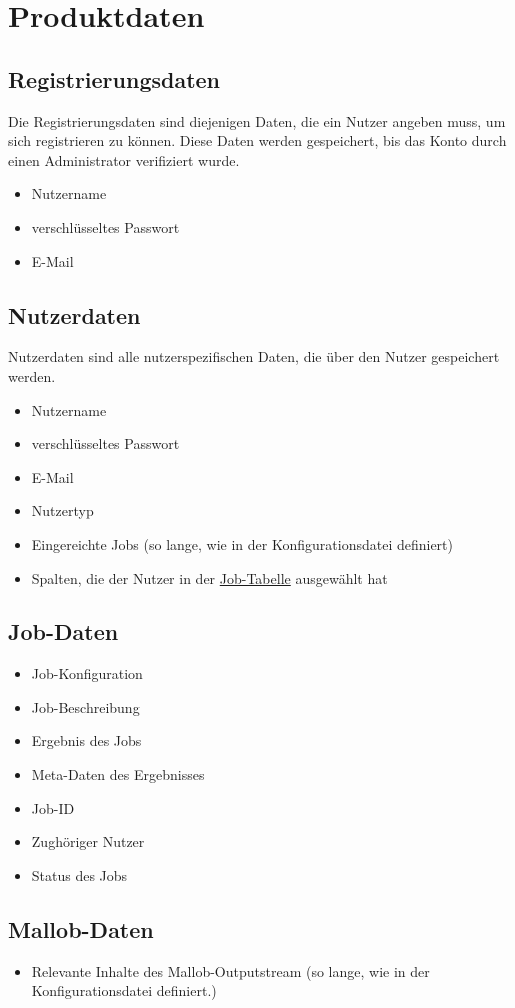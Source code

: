 
\section{Produktdaten}
\label{PD}

\label{PD:Registrierungsdaten}
\subsection{Registrierungsdaten}
Die Registrierungsdaten sind diejenigen Daten, die ein Nutzer angeben muss, um sich registrieren zu können. Diese Daten werden gespeichert, bis das Konto durch einen Administrator verifiziert wurde.
\begin{itemize}[noitemsep]
    \item Nutzername
    \item verschlüsseltes Passwort
    \item E-Mail
\end{itemize}

\label{PD:Nutzerdaten}
\subsection{Nutzerdaten}
Nutzerdaten sind alle nutzerspezifischen Daten, die über den Nutzer gespeichert werden.
\begin{itemize}[noitemsep]
    \item Nutzername
    \item verschlüsseltes Passwort
    \item E-Mail
    \item Nutzertyp
    \item Eingereichte Jobs (so lange, wie in der Konfigurationsdatei definiert)
    \item Spalten, die der Nutzer in der \hyperref[pages:job-table]{Job-Tabelle} ausgewählt hat
\end{itemize}



\subsection{Job-Daten}
\begin{itemize}[noitemsep]
    \item Job-Konfiguration
    \item Job-Beschreibung
    \item Ergebnis des Jobs
    \item Meta-Daten des Ergebnisses
    \item Job-ID
    \item Zughöriger Nutzer
    \item Status des Jobs
\end{itemize}

\subsection{Mallob-Daten}
\begin{itemize}
    \item Relevante Inhalte des Mallob-Outputstream (so lange, wie in der Konfigurationsdatei definiert.)
\end{itemize}

